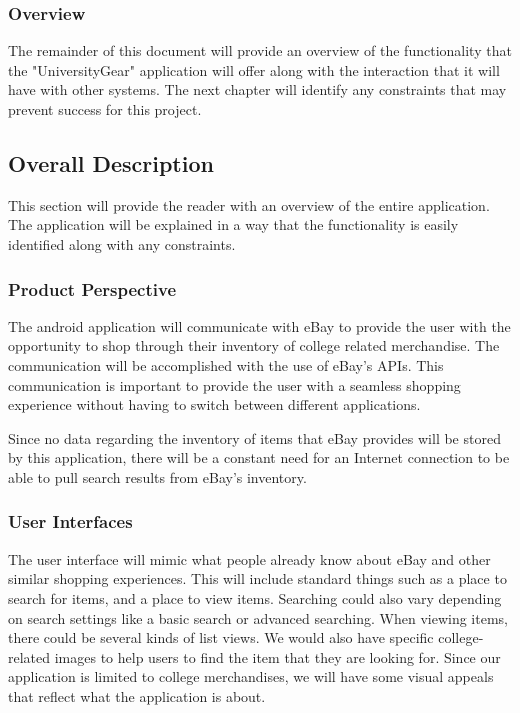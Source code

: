 \documentclass[journal,compsoc, 10pt, draftclsnofoot, onecolumn]{IEEEtran}
\begin{document}
\newpage

\subsubsection{Overview}

The remainder of this document will provide an overview of the functionality 
that the "UniversityGear" application will offer along with the 
interaction that it will have with other systems. The next chapter will identify
 any constraints that may prevent success for this project.

\subsection{Overall Description}

This section will provide the reader with an overview of the entire application.
 The application will be explained in a way that the functionality is easily 
identified along with any constraints.

\subsubsection{Product Perspective}

The android application will communicate with eBay to provide the user with the 
opportunity to shop through their inventory of college related merchandise. The 
communication will be accomplished with the use of eBay's APIs. This 
communication is important to provide the user with a seamless shopping 
experience without having to switch between different applications.\newline

Since no data regarding the inventory of items that eBay provides will be stored
 by this application, there will be a constant need for an Internet connection 
to be able to pull search results from eBay's inventory. 

\subsubsection{User Interfaces}

The user interface will mimic what people already know about eBay and other 
similar shopping experiences. This will include standard things such as a place 
to search for items, and a place to view items. Searching 
could also vary depending on search settings like a basic search or advanced 
searching. When viewing items, there could be several kinds of list views. We 
would also have specific college-related images to help users to find the item 
that they are looking for. Since our application is limited to college 
merchandises, we will have some visual appeals that reflect what the application
 is about.
\end{document}
